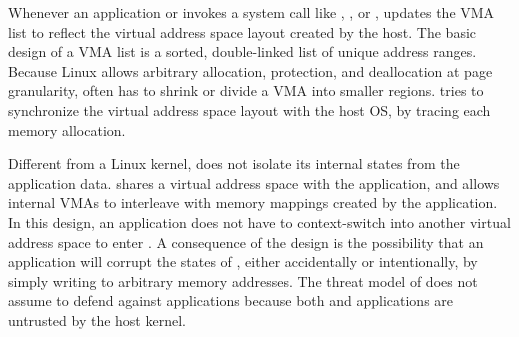 Whenever an application or \glibc{} invokes a system call like , , or , \thelibos{} updates the VMA list
to reflect the virtual address space layout created by the host.
The basic design of a VMA list is a sorted, double-linked list of unique address ranges.
Because Linux allows arbitrary allocation, protection, and deallocation at page granularity, \thelibos{} often has to shrink or divide a VMA
into smaller regions.
\thelibos{} tries to synchronize
the virtual address space layout with the host OS, by tracing each memory allocation.







Different from a Linux kernel, \thelibos{} does not isolate its internal states from the application data.
\thelibos{} shares a virtual address space with the application,
and allows internal VMAs to interleave with memory mappings created by the application.
In this design, an application does not have to context-switch into another virtual address space to enter \thelibos{}.
A consequence of the design is the possibility that an application will corrupt the states of \thelibos{}, either accidentally or intentionally, by simply writing to arbitrary memory addresses.
The threat model of \graphene{} does not assume
\thelibos{} to defend against applications because both \thelibos{} and applications are untrusted by the host kernel. 




